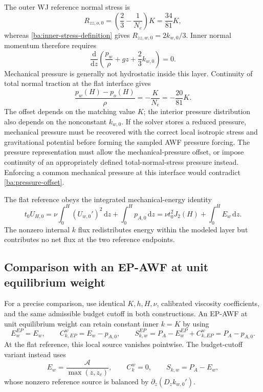 \documentclass[11pt,a4paper]{article}
\numberwithin{equation}{section}
\begin{document}
The outer WJ reference normal stress is
\begin{equation}
 R_{zz,o,0}=\left(\frac23-\frac1{N_e}\right)K
 =\frac{34}{81}K,
 \label{ba:outer-normal-stress}
\end{equation}
whereas \eqref{ba:inner-stress-definition} gives
$R_{zz,w,0}=2k_{w,0}/3$. Inner normal momentum therefore requires
\begin{equation}
 \frac{\mathrm d}{\mathrm dz}
 \left(\frac{p_w}{\rho}+gz+\frac23k_{w,0}\right)=0.
 \label{ba:inner-pressure}
\end{equation}
Mechanical pressure is generally not hydrostatic inside this layer.
Continuity of total normal traction at the flat interface gives
\begin{equation}
 \boxed{\frac{p_w(H)-p_o(H)}{\rho}
 =-\frac{K}{N_e}=-\frac{20}{81}K.}
 \label{ba:pressure-offset}
\end{equation}
The offset depends on the matching value $K$; the interior pressure
distribution also depends on the nonconstant $k_{w,0}$. If the solver
stores a reduced pressure, mechanical pressure must be recovered with the
correct local isotropic stress and gravitational potential before forming
the sampled AWF pressure forcing. The pressure representation must allow
the mechanical-pressure offset, or impose continuity of an appropriately
defined total-normal-stress pressure instead. Enforcing a common mechanical
pressure at this interface would contradict \eqref{ba:pressure-offset}.

The flat reference obeys the integrated mechanical-energy identity
\begin{equation}
 \boxed{t_0U_{H,0}
 =\nu\int_0^H(U_{w,0}')^2\,\mathrm dz
  +\int_0^Hp_{A,0}\,\mathrm dz
 =\nu t_0^2J_2(H)+\int_0^HE_w\,\mathrm dz.}
 \label{ba:energy}
\end{equation}
The nonzero internal $k$ flux redistributes energy within the modeled
layer but contributes no net flux at the two reference endpoints.

\subsection{Comparison with an EP-AWF at unit equilibrium weight}
\label{ba:ep-comparison}

For a precise comparison, use identical $K,h,H,\nu$, calibrated viscosity
coefficients, and the same admissible budget cutoff in both constructions.
An EP-AWF at unit equilibrium weight can retain constant inner $k=K$ by
using
\begin{equation}
 E_w^{EP}=E_w,\qquad
 C_{k,EP}^w=E_w-p_{A,0},\qquad
 S_{k,w}^{EP}=P_A-E_w^{EP}+C_{k,EP}^w=P_A-p_{A,0}.
 \label{ba:ep-source}
\end{equation}
At the flat reference, this local source vanishes pointwise. The
budget-cutoff variant instead uses
\begin{equation}
 E_w=\frac{\mathcal A}{\max(z,z_c)},\qquad
 C_k^w=0,\qquad S_{k,w}=P_A-E_w,
 \label{ba:budget-source}
\end{equation}
whose nonzero reference source is balanced by
$\partial_z(D_zk_{w,0}')$.
\end{document}
